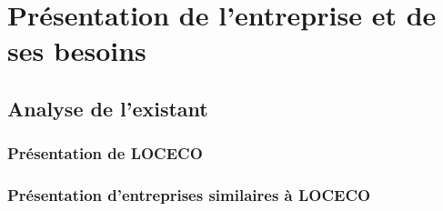 \chapter{Présentation de l'entreprise et de ses besoins}

\section{Analyse de l'existant}

\subsection{Présentation de LOCECO}

\subsection{Présentation d'entreprises similaires à LOCECO}